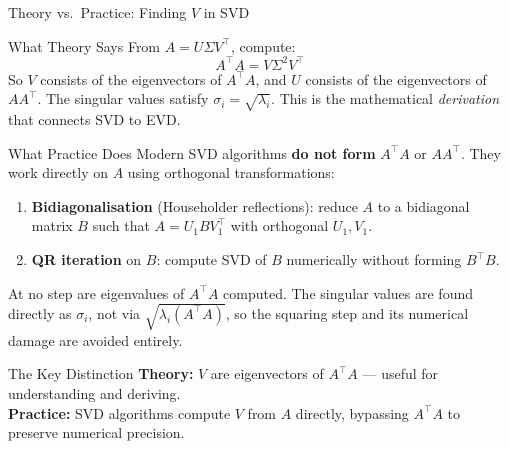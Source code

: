 \documentclass{beamer}
\begin{document}
\begin{frame}[shrink=10]{Theory vs.\ Practice: Finding $V$ in SVD}
  \begin{block}{What Theory Says}
    From $A = U\Sigma V^\top$, compute:
    \[
      A^\top A = V\Sigma^2 V^\top
    \]
    So $V$ consists of the eigenvectors of $A^\top A$, and
    $U$ consists of the eigenvectors of $AA^\top$.
    The singular values satisfy $\sigma_i = \sqrt{\lambda_i}$.
    This is the mathematical \emph{derivation} that connects SVD to EVD.
  \end{block}

  \begin{block}{What Practice Does}
    Modern SVD algorithms \textbf{do not form} $A^\top A$ or $AA^\top$.
    They work directly on $A$ using orthogonal transformations:
    \begin{enumerate}\setlength\itemsep{4pt}
      \item \textbf{Bidiagonalisation} (Householder reflections):
            reduce $A$ to a bidiagonal matrix $B$ such that
            $A = U_1 B V_1^\top$ with orthogonal $U_1, V_1$.
      \item \textbf{QR iteration} on $B$: compute SVD of $B$
            numerically without forming $B^\top B$.
    \end{enumerate}
    At no step are eigenvalues of $A^\top A$ computed.
    The singular values are found directly as $\sigma_i$, not via
    $\sqrt{\lambda_i(A^\top A)}$, so the squaring step and its
    numerical damage are avoided entirely.
  \end{block}

  \begin{exampleblock}{The Key Distinction}
    \textbf{Theory:} $V$ are eigenvectors of $A^\top A$ --- useful for
    understanding and deriving.\\
    \textbf{Practice:} SVD algorithms compute $V$ from $A$ directly,
    bypassing $A^\top A$ to preserve numerical precision.
  \end{exampleblock}
\end{frame}
\end{document}
